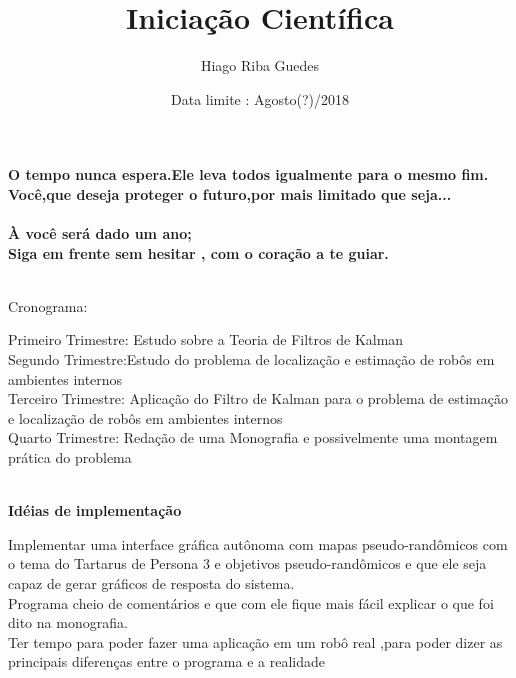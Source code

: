 \documentclass[11pt,a4paper]{article}
\title{Iniciação Científica}
\author{Hiago Riba Guedes}
\date{Data limite : Agosto(?)/2018}
\begin{document}
\maketitle
\textbf{O tempo nunca espera.Ele leva todos igualmente para o mesmo fim.\\Você,que deseja proteger o futuro,por mais limitado que seja...\\\\ À você será dado um ano;\\Siga em frente sem hesitar , com o coração a te guiar.  }\\\\
\begin{center}
Cronograma:
\end{center}
Primeiro Trimestre: Estudo sobre a Teoria de Filtros de Kalman\\
Segundo Trimestre:Estudo do problema de localização e estimação de robôs em ambientes internos \\
Terceiro Trimestre: Aplicação do Filtro de Kalman para o problema de estimação e localização de robôs em ambientes internos\\
Quarto Trimestre: Redação de uma Monografia e possivelmente uma montagem prática do problema\\\\
\begin{center}
\textbf{Idéias de implementação}
\end{center}
Implementar uma interface gráfica autônoma com mapas pseudo-randômicos com o tema do Tartarus de Persona 3 e objetivos pseudo-randômicos e que ele seja capaz de gerar gráficos de resposta do sistema. \\
Programa cheio de comentários e que com ele fique mais fácil explicar o que foi dito na monografia.\\
Ter tempo para poder fazer uma aplicação em um robô real ,para poder dizer as principais diferenças entre o programa e a realidade \\
\end{document}
